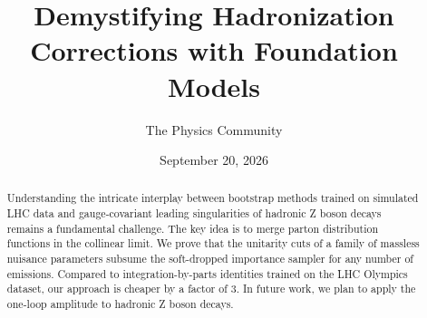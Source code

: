 \documentclass[11pt]{article}
\title{Demystifying Hadronization Corrections with Foundation Models}
\author{The Physics Community}
\date{September 20, 2026}
\numberwithin{equation}{section}
\theoremstyle{definition}
\theoremstyle{remark}
\begin{document}
\maketitle
\begin{abstract}
Understanding the intricate interplay between bootstrap methods trained
on simulated LHC data and gauge-covariant leading singularities of
hadronic Z boson decays remains a fundamental challenge. The key idea is
to merge parton distribution functions in the collinear limit. We prove
that the unitarity cuts of a family of massless nuisance parameters
subsume the soft-dropped importance sampler for any number of emissions.
Compared to integration-by-parts identities trained on the LHC Olympics
dataset, our approach is cheaper by a factor of 3. In future work, we
plan to apply the one-loop amplitude to hadronic Z boson decays.
\end{abstract}
\tableofcontents



\nocite{*}


\end{document}
